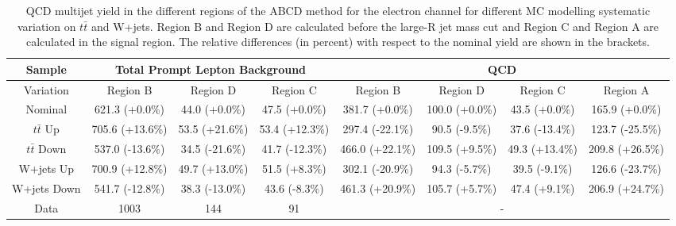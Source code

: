 \begin{table}[htbp!]
\begin{tiny}
\begin{center}
\begin{tabular}{c|c|c|c||c|c|c|c}
Sample        &\multicolumn{3}{c||}{Total Prompt Lepton Background}      &\multicolumn{4}{c}{QCD}                                                  \\
\hline  
Variation     & Region B          & Region D        & Region C       & Region B          & Region D       & Region C       & Region A         \\ 
\hline  
Nominal       &621.3     (+0.0\%)  & 44.0 (+0.0\%)  & 47.5  (+0.0\%) & 381.7   (+0.0\%)  & 100.0 (+0.0\%) & 43.5 (+0.0\%)  & 165.9 (+0.0\%) \\ 
\hline
$t\bar{t}$ Up   &705.6     (+13.6\%) & 53.5 (+21.6\%) & 53.4  (+12.3\%) & 297.4  (-22.1\%) & 90.5  (-9.5\%) & 37.6 (-13.4\%) & 123.7 (-25.5\%) \\
$t\bar{t}$ Down &537.0     (-13.6\%) & 34.5 (-21.6\%) & 41.7  (-12.3\%) & 466.0  (+22.1\%) & 109.5 (+9.5\%) & 49.3 (+13.4\%) & 209.8 (+26.5\%) \\  
W+jets     Up   &700.9     (+12.8\%) & 49.7 (+13.0\%) & 51.5  (+8.3\%)  & 302.1  (-20.9\%) & 94.3  (-5.7\%) & 39.5 (-9.1\%)  & 126.6 (-23.7\%) \\
W+jets     Down &541.7     (-12.8\%) & 38.3 (-13.0\%) & 43.6  (-8.3\%)  & 461.3  (+20.9\%) & 105.7 (+5.7\%) & 47.4 (+9.1\%)  & 206.9 (+24.7\%) \\ 
\hline 
\hline 
Data          & 1003  & 144   & 91  &\multicolumn{4}{c}{-} \\ 
\hline  
\end{tabular}
\end{center}
\caption{QCD multijet yield in the different regions of the ABCD method for the electron channel for 
different MC modelling systematic variation on $t\bar{t}$ and W+jets. Region B and Region D are calculated 
before the large-R jet mass cut and Region C and Region A are calculated in the signal region. The relative 
differences (in percent) with respect to the nominal yield are shown in the brackets.} 
\label{tab:boosted_qcd_mcmodel_elec_sr}
\end{tiny}
\end{table} 
%
%
